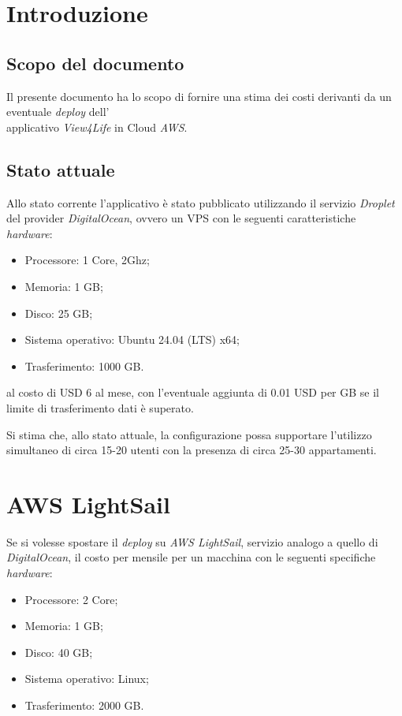 \documentclass[10pt, letterpaper]{article}
\begin{document}
\makeTitlePage

\newpage

\tableofcontents

\newpage

\section{Introduzione}

\subsection{Scopo del documento}
Il presente documento ha lo scopo di fornire una stima dei costi derivanti da un eventuale \textit{deploy} dell'\\applicativo \textit{View4Life} in Cloud \textit{AWS}.

\subsection{Stato attuale}
Allo stato corrente l'applicativo è stato pubblicato utilizzando il servizio \textit{Droplet} del provider \textit{DigitalOcean}, ovvero un VPS con le seguenti caratteristiche \textit{hardware}:
\begin{itemize}
    \item Processore: 1 Core, 2Ghz;
    \item Memoria: 1 GB;
    \item Disco: 25 GB;
    \item Sistema operativo: Ubuntu 24.04 (LTS) x64;
    \item Trasferimento: 1000 GB.
\end{itemize}

al costo di USD 6 al mese, con l'eventuale aggiunta di 0.01 USD per GB se il limite di trasferimento dati è superato.

Si stima che, allo stato attuale, la configurazione possa supportare l'utilizzo simultaneo di circa 15-20 utenti con la presenza di circa 25-30 appartamenti.

\section{AWS LightSail}
Se si volesse spostare il \textit{deploy} su \textit{AWS LightSail}, servizio analogo a quello di \textit{DigitalOcean}, il costo per mensile per un macchina con le seguenti specifiche \textit{hardware}: 
\begin{itemize}
    \item Processore: 2 Core;
    \item Memoria: 1 GB;
    \item Disco: 40 GB;
    \item Sistema operativo: Linux;
    \item Trasferimento: 2000 GB.
\end{itemize}
\end{document}
